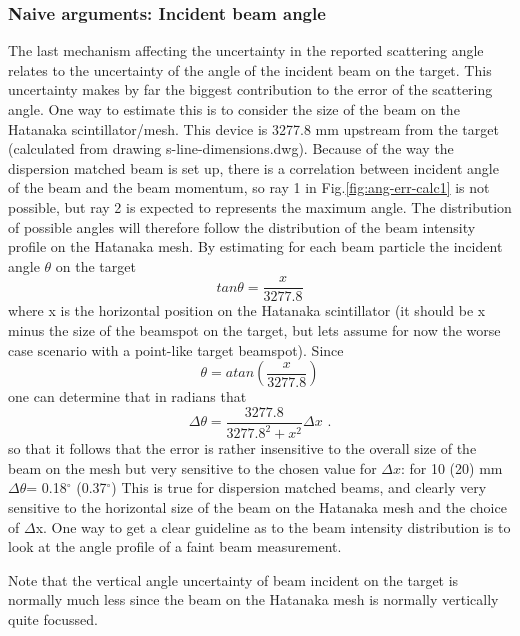 \documentclass[11pt]{report}
\begin{document}
\subsubsection{Naive arguments: Incident beam angle}\label{sec:incidentbeamangle}
The last mechanism affecting the uncertainty in the reported scattering angle relates to the uncertainty 
of the angle of the incident beam on the target.
This uncertainty makes by far the biggest contribution to the error of the scattering angle.
One way to estimate this is to consider the size of the beam on the Hatanaka scintillator/mesh. This device is
3277.8 mm upstream from the target (calculated from drawing s-line-dimensions.dwg). Because of the way the dispersion matched beam is set up, there is a correlation between
incident angle of the beam and the beam momentum, so ray 1 in Fig.\ref{fig:ang-err-calc1} is not possible, but
ray 2 is expected to represents the maximum angle.
The distribution of possible angles will therefore follow the distribution of the beam intensity profile on the Hatanaka mesh.
By estimating for each beam particle the incident angle $\theta$ on the target
\begin{equation} 
tan\theta =\frac{x}{3277.8}
\end{equation} 
where x is the horizontal position on the Hatanaka scintillator (it should be x minus the size of the beamspot on the target, but lets assume for now the worse case scenario with a point-like target beamspot).
Since
\begin{equation} 
\theta = atan (\frac{x}{3277.8})
\end{equation} 
one can determine that in radians that
\begin{equation} 
\Delta\theta =\frac{3277.8}{3277.8^2 + x^2}  \Delta x    \textrm{  .}
\end{equation} 
so that it follows that the error is rather insensitive to the overall size of the beam on the mesh
but very sensitive to the chosen value for $\Delta x$: for 10 (20) mm $\Delta \theta$= 0.18$^{\circ}$ (0.37$^{\circ}$)  
This is true for dispersion matched beams, and clearly very sensitive to the horizontal size of the beam on the
Hatanaka mesh and the choice of $\Delta$x. One way to get a clear guideline as to the beam intensity distribution is to look
at the angle profile of a faint beam measurement.

Note that the vertical angle uncertainty of beam incident on the target is normally much less since the beam on
the Hatanaka mesh is normally vertically quite focussed.
\end{document}
